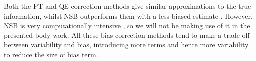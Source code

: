 Both the PT and QE correction methods give similar approximations to the true information, whilst NSB outperforms them with a less biased estimate \cite{Panzeri2007}. However, NSB is very computationally intensive \cite{Panzeri2007}, so we will not be making use of it in the presented body work.
All these bias correction methods tend to make a trade off between variability and bias, introducing more terms and hence more variability to reduce the size of bias term.





